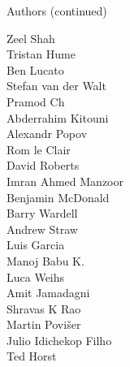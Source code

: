 \documentclass[xcolor=svgnames]{beamer}
\begin{document}
\begin{frame}{Authors (continued)}
\begin{multicols}{5}
        Zeel Shah\\
        Tristan Hume\\
        Ben Lucato\\
        Stefan van der Walt\\
        Pramod Ch\\
        Abderrahim Kitouni\\
        Alexandr Popov\\
        Rom le Clair\\
        David Roberts\\
        Imran Ahmed Manzoor\\
        Benjamin McDonald\\
        Barry Wardell\\
        Andrew Straw\\
        Luis Garcia\\
        Manoj Babu K.\\
        Luca Weihs\\
        Amit Jamadagni\\
        Shravas K Rao\\
        Martin Povišer\\
        Julio Idichekop Filho\\
        Ted Horst\\
  \end{multicols}
\end{frame}
\end{document}

